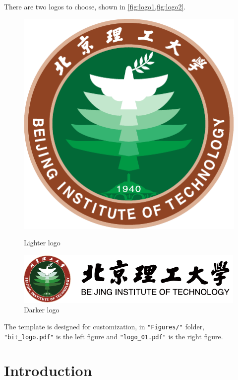\documentclass[12pt,english, openany]{book}
\begin{document}
	There are two logos to choose, shown in \cref{fig:logo1,fig:logo2}. 
	\begin{figure}[ht]
		\centering
		\begin{minipage}[c]{0.4\linewidth}
			\includegraphics[width=0.9\linewidth]{Figures/bit_logo.pdf}
			\caption{Lighter logo}
			\label{fig:logo1}
		\end{minipage}
		\hspace{1.4cm}
		\begin{minipage}[c]{0.4\linewidth}
			\includegraphics[width=0.9\linewidth]{Figures/logo_01.pdf}
			\caption{Darker logo}
			\label{fig:logo2}
		\end{minipage}%
	\end{figure}
	
	The template is designed for customization, in \texttt{"Figures/"} folder, \texttt{"bit\_logo.pdf"} is the left figure and \texttt{"logo\_01.pdf"} is the right figure.
	
	\chapter{Introduction}\label{chapt:intro}
	
\end{document}
